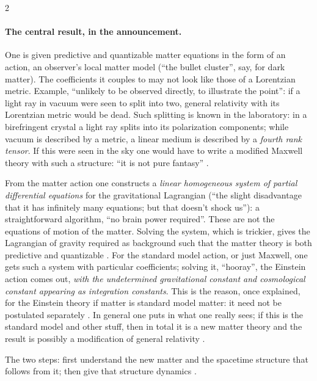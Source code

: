 \begin{paracol}{2}
\paragraph{The central result, in the announcement.} One is given predictive and quantizable matter equations in the form of an action, an observer's local matter model (``the bullet cluster'', say, for dark matter). The coefficients it couples to may not look like those of a Lorentzian metric. Example, ``unlikely to be observed directly, to illustrate the point'': if a light ray in vacuum were seen to split into two, general relativity with its Lorentzian metric would be dead. Such splitting is known in the laboratory: in a birefringent crystal a light ray splits into its polarization components; while vacuum is described by a metric, a linear medium is described by a \emph{fourth rank tensor}. If this were seen in the sky one would have to write a modified Maxwell theory with such a structure: ``it is not pure fantasy'' .

From the matter action one constructs a \emph{linear homogeneous system of partial differential equations} for the gravitational Lagrangian (``the slight disadvantage that it has infinitely many equations; but that doesn't shock us''): a straightforward algorithm, ``no brain power required''. These are not the equations of motion of the matter. Solving the system, which is trickier, gives the Lagrangian of gravity required as background such that the matter theory is both predictive and quantizable . For the standard model action, or just Maxwell, one gets such a system with particular coefficients; solving it, ``hooray'', the Einstein action comes out, \emph{with the undetermined gravitational constant and cosmological constant appearing as integration constants}. This is the reason, once explained, for the Einstein theory if matter is standard model matter: it need not be postulated separately . In general one puts in what one really sees; if this is the standard model and other stuff, then in total it is a new matter theory and the result is possibly a modification of general relativity .

The two steps: first understand the new matter and the spacetime structure that follows from it; then give that structure dynamics .


\end{paracol}
